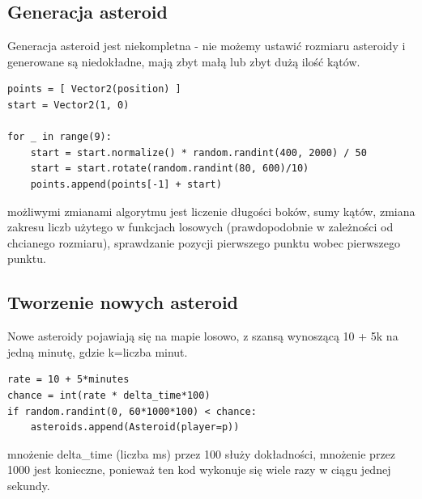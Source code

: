 \documentclass[12pt,a4paper]{article}
\begin{document}
\subsection{Generacja asteroid}
Generacja asteroid jest niekompletna - nie możemy ustawić rozmiaru asteroidy i generowane są niedokładne, mają zbyt małą lub zbyt dużą ilość kątów.
\begin{verbatim}
points = [ Vector2(position) ]
start = Vector2(1, 0)

for _ in range(9):
    start = start.normalize() * random.randint(400, 2000) / 50
    start = start.rotate(random.randint(80, 600)/10)
    points.append(points[-1] + start)
\end{verbatim}
możliwymi zmianami algorytmu jest liczenie długości boków, sumy kątów, zmiana zakresu liczb użytego w funkcjach losowych (prawdopodobnie w zależności od chcianego rozmiaru), sprawdzanie pozycji pierwszego punktu wobec pierwszego punktu.


\subsection{Tworzenie nowych asteroid}
Nowe asteroidy pojawiają się na mapie losowo, z szansą wynoszącą 10 + 5k na jedną minutę, gdzie k=liczba minut.
\begin{verbatim}
rate = 10 + 5*minutes
chance = int(rate * delta_time*100) 
if random.randint(0, 60*1000*100) < chance:
    asteroids.append(Asteroid(player=p))
\end{verbatim}
mnożenie delta\_time (liczba ms) przez 100 służy dokładności, mnożenie przez 1000 jest konieczne, ponieważ ten kod wykonuje się wiele razy w ciągu jednej sekundy.

\printbibliography %
\end{document}
